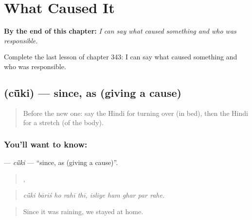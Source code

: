 
\chapter{What Caused It}
\label{ch:hi-what-caused-it}

\begin{chapteropening}
\textbf{By the end of this chapter:} \emph{I can say what caused something and who was responsible.}

Complete the last lesson of chapter 343: I can say what caused something and who was responsible.
\end{chapteropening}

\section[\texorpdfstring{\hi{चूँकि} (cū̃ki)}{चूँकि (cū̃ki)}]{ (cū̃ki) — since, as (giving a cause)}

\label{lesson:HI-C343-cuki}



\begin{quote}
Before the new one: say the Hindi for turning over (in bed), then the Hindi for a stretch (of the body).
\end{quote}

\subsection*{You'll want to know: }
\textbf{} — \emph{cū̃ki} — \textquotedblleft{}since, as (giving a cause)\textquotedblright{}.

\begin{quote}
    ,     
\end{quote}

\begin{quote}
\emph{cū̃ki bāriś ho rahī thī, isliye ham ghar par rahe.}
\end{quote}

\begin{quote}
Since it was raining, we stayed at home.
\end{quote}

